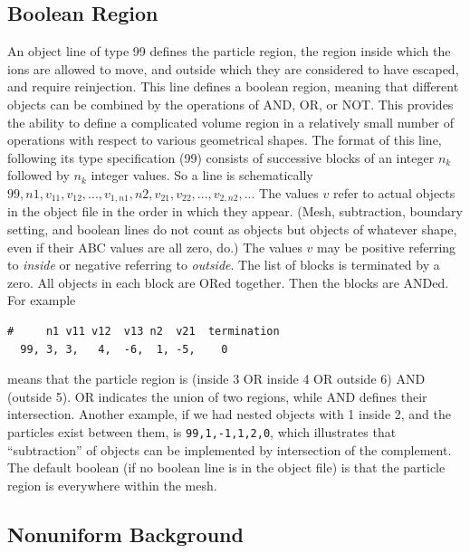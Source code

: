 \documentclass[12pt]{article}
\begin{document}
\subsection{Boolean Region}

An object line of type 99 defines the particle region, the region
inside which the ions are allowed to move, and outside which they are
considered to have escaped, and require reinjection. This line defines
a boolean region, meaning that different objects can be combined by
the operations of AND, OR, or NOT. This provides the ability to define
a complicated volume region in a relatively small number of operations
with respect to various geometrical shapes. The format of this line,
following its type specification (99) consists of successive blocks of
an integer $n_k$ followed by $n_k$ integer values. So a line is
schematically
$99,n1,v_{11},v_{12},...,v_{1,n1},n2,v_{21},v_{22},...,v_{2,n2},...$
The values $v$ refer to actual objects in the object file in the order
in which they appear. (Mesh, subtraction, boundary setting, and boolean lines do
not count as objects but objects of whatever shape, even if their ABC
values are all zero, do.)  The values $v$ may be positive referring to
\emph{inside} or negative referring to \emph{outside}. The list of
blocks is terminated by a zero. All objects in each block are ORed
together. Then the blocks are ANDed. For example
\begin{verbatim}
#     n1 v11 v12  v13 n2  v21  termination
  99, 3, 3,   4,  -6,  1, -5,    0
\end{verbatim}
means that the particle region is (inside 3 OR inside 4 OR outside 6)
AND (outside 5). OR indicates the union of two regions, while AND defines
their intersection. Another example, if we had nested objects with 1
inside 2, and the particles exist between them, is
\verb!99,1,-1,1,2,0!, which illustrates that ``subtraction'' of
objects can be implemented by intersection of the complement.  The
default boolean (if no boolean line is in the object file) is that the
particle region is everywhere within the mesh.


\subsection{Nonuniform Background}
\end{document}
